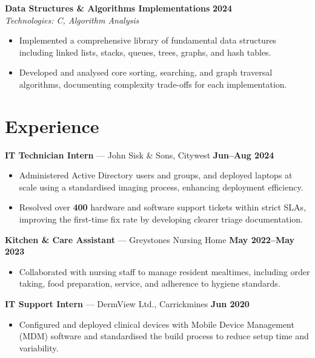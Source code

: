 \documentclass[10pt,a4paper]{article}
\begin{document}
\medskip
\textbf{Data Structures \& Algorithms Implementations} \hfill \textbf{2024} \\
\textit{Technologies: C, Algorithm Analysis}
\begin{itemize}
    \item Implemented a comprehensive library of fundamental data structures including linked lists, stacks, queues, trees, graphs, and hash tables.
    \item Developed and analysed core sorting, searching, and graph traversal algorithms, documenting complexity trade-offs for each implementation.
\end{itemize}


\section*{Experience}
\textbf{IT Technician Intern} --- John Sisk \& Sons, Citywest \hfill \textbf{Jun--Aug 2024}
\begin{itemize}
    \item Administered Active Directory users and groups, and deployed laptops at scale using a standardised imaging process, enhancing deployment efficiency.
    \item Resolved over \textbf{400} hardware and software support tickets within strict SLAs, improving the first-time fix rate by developing clearer triage documentation.
\end{itemize}
\medskip
\textbf{Kitchen \& Care Assistant} --- Greystones Nursing Home \hfill \textbf{May 2022--May 2023}
\begin{itemize}
    \item Collaborated with nursing staff to manage resident mealtimes, including order taking, food preparation, service, and adherence to hygiene standards.
\end{itemize}
\medskip
\textbf{IT Support Intern} --- DermView Ltd., Carrickmines \hfill \textbf{Jun 2020}
\begin{itemize}
    \item Configured and deployed clinical devices with Mobile Device Management (MDM) software and standardised the build process to reduce setup time and variability.
\end{itemize}


\end{document}
